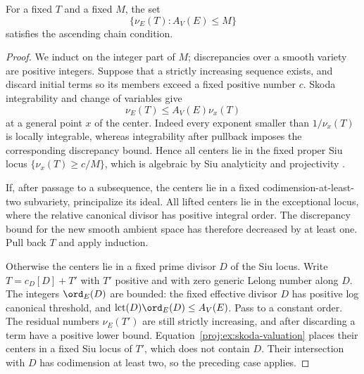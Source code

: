 \begin{lemma}\label{proj:ex:valuation-acc}
For a fixed \(T\) and a fixed \(M\), the set
\[
 \{\nu_E(T): A_V(E)\leq M\}
\]
satisfies the ascending chain condition.
\end{lemma}
\begin{proof}
We induct on the integer part of \(M\); discrepancies over a
smooth variety are positive integers. Suppose that a strictly
increasing sequence exists, and discard initial terms so its
members exceed a fixed positive number \(c\).
Skoda integrability and change of variables give
\begin{equation}\label{proj:ex:skoda-valuation}
 \nu_E(T)\leq A_V(E)\nu_x(T)
\end{equation}
at a general point \(x\) of the center. Indeed every exponent
smaller than \(1/\nu_x(T)\) is locally integrable, whereas
integrability after pullback imposes the corresponding
discrepancy bound. Hence all centers lie in the fixed proper Siu
locus \(\{\nu_x(T)\geq c/M\}\), which is algebraic by Siu
analyticity and projectivity \cite{Proj-Siu1974}.

If, after passage to a subsequence, the centers lie in a fixed
codimension-at-least-two subvariety, principalize its ideal.
All lifted centers lie in the exceptional locus, where the
relative canonical divisor has positive integral order.
The discrepancy bound for the new smooth ambient space has
therefore decreased by at least one. Pull back \(T\) and apply
induction.

Otherwise the centers lie in a fixed prime divisor \(D\) of the
Siu locus. Write \(T=c_D[D]+T'\) with \(T'\) positive and with
zero generic Lelong number along \(D\). The integers
\(\ord_E(D)\) are bounded: the fixed effective divisor \(D\) has
positive log canonical threshold, and
\(\operatorname{lct}(D)\ord_E(D)\leq A_V(E)\).
Pass to a constant order. The residual numbers \(\nu_E(T')\)
are still strictly increasing, and after discarding a term have
a positive lower bound. Equation~\eqref{proj:ex:skoda-valuation}
places their centers in a fixed Siu locus of \(T'\), which does
not contain \(D\). Their intersection with \(D\) has codimension
at least two, so the preceding case applies.
\end{proof}

